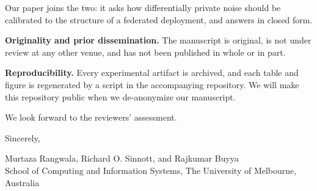 \documentclass[11pt,a4paper]{article}
\newcommand{\lhead}[1]{\medskip\noindent\textbf{#1}\quad\ignorespaces}
\begin{document}
Our paper joins the two: it asks how differentially private noise should be calibrated to the
structure of a federated deployment, and answers in closed form.

\lhead{Originality and prior dissemination.}
The manuscript is original, is not under review at any other venue, and has not been published
in whole or in part.

\lhead{Reproducibility.}
Every experimental artifact is archived, and each table and figure is regenerated by a script in the accompanying repository. We will make this repository public when we de-anonymize our manuscript.

\medskip
We look forward to the reviewers' assessment.

\medskip
\noindent Sincerely,\nopagebreak

\medskip
\noindent
Murtaza Rangwala, Richard O. Sinnott, and Rajkumar Buyya\\
School of Computing and Information Systems, The University of Melbourne, Australia

\medskip


\end{document}
